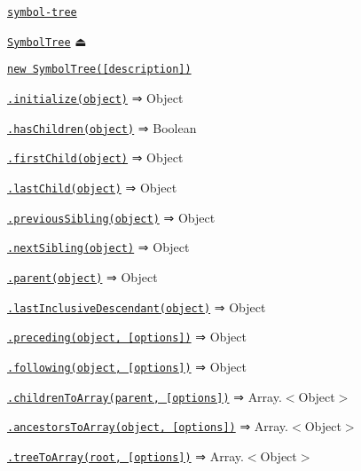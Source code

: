 \begin{DoxyItemize}
\item \href{#module_symbol-tree}{\tt symbol-\/tree}
\begin{DoxyItemize}
\item \href{#exp_module_symbol-tree--SymbolTree}{\tt Symbol\+Tree} ⏏
\begin{DoxyItemize}
\item \href{#new_module_symbol-tree--SymbolTree_new}{\tt new Symbol\+Tree(\mbox{[}description\mbox{]})}
\item \href{#module_symbol-tree--SymbolTree+initialize}{\tt .initialize(object)} ⇒ {\ttfamily Object}
\item \href{#module_symbol-tree--SymbolTree+hasChildren}{\tt .has\+Children(object)} ⇒ {\ttfamily Boolean}
\item \href{#module_symbol-tree--SymbolTree+firstChild}{\tt .first\+Child(object)} ⇒ {\ttfamily Object}
\item \href{#module_symbol-tree--SymbolTree+lastChild}{\tt .last\+Child(object)} ⇒ {\ttfamily Object}
\item \href{#module_symbol-tree--SymbolTree+previousSibling}{\tt .previous\+Sibling(object)} ⇒ {\ttfamily Object}
\item \href{#module_symbol-tree--SymbolTree+nextSibling}{\tt .next\+Sibling(object)} ⇒ {\ttfamily Object}
\item \href{#module_symbol-tree--SymbolTree+parent}{\tt .parent(object)} ⇒ {\ttfamily Object}
\item \href{#module_symbol-tree--SymbolTree+lastInclusiveDescendant}{\tt .last\+Inclusive\+Descendant(object)} ⇒ {\ttfamily Object}
\item \href{#module_symbol-tree--SymbolTree+preceding}{\tt .preceding(object, \mbox{[}options\mbox{]})} ⇒ {\ttfamily Object}
\item \href{#module_symbol-tree--SymbolTree+following}{\tt .following(object, \mbox{[}options\mbox{]})} ⇒ {\ttfamily Object}
\item \href{#module_symbol-tree--SymbolTree+childrenToArray}{\tt .children\+To\+Array(parent, \mbox{[}options\mbox{]})} ⇒ {\ttfamily Array.$<$Object$>$}
\item \href{#module_symbol-tree--SymbolTree+ancestorsToArray}{\tt .ancestors\+To\+Array(object, \mbox{[}options\mbox{]})} ⇒ {\ttfamily Array.$<$Object$>$}
\item \href{#module_symbol-tree--SymbolTree+treeToArray}{\tt .tree\+To\+Array(root, \mbox{[}options\mbox{]})} ⇒ {\ttfamily Array.$<$Object$>$}

\end{DoxyItemize}
\end{DoxyItemize}
\end{DoxyItemize}
